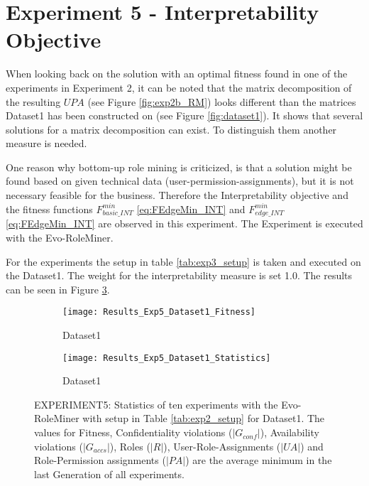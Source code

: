 \section{Experiment 5 - Interpretability Objective}
\label{sec:exp5}
When looking back on the solution with an optimal fitness found in one of the experiments in Experiment 2, it can be noted that the matrix decomposition of the resulting $UPA$ (see Figure \ref{fig:exp2b_RM}) looks different than the matrices Dataset1 has been constructed on (see Figure \ref{fig:dataset1}). It shows that several solutions for a matrix decomposition can exist. To distinguish them another measure is needed. 

One reason why bottom-up role mining is criticized, is that a solution might be found based on given technical data (user-permission-assignments), but it is not necessary feasible for the business. Therefore the Interpretability objective and the fitness functions
$F_{basic\_INT}^{min}$ \eqref{eq:FEdgeMin_INT} and $F_{edge\_INT}^{min}$ \eqref{eq:FEdgeMin_INT} are observed in this experiment. The Experiment is executed with the Evo-RoleMiner.

For the experiments the setup in table \ref{tab:exp3_setup} is taken and executed on the Dataset1. The weight for the interpretability measure is set 1.0. The results can be seen in Figure \ref{fig:Results_Exp5}.

\begin{figure}[H]
	\centering
	\begin{subfigure}{0.45\textwidth}
		\texttt{[image: Results\_Exp5\_Dataset1\_Fitness]}
		\caption{Dataset1}
		\label{fig:Results_Exp5_Dataset1_Fitness}
	\end{subfigure}%
	\begin{subfigure}{0.55\textwidth}
		\centering
		\texttt{[image: Results\_Exp5\_Dataset1\_Statistics]}
		\caption{Dataset1}
		\label{fig:Results_Exp5_Dataset1_Statistics}
	\end{subfigure}
	\caption{EXPERIMENT5: Statistics of ten experiments with the Evo-RoleMiner with setup in Table \ref{tab:exp2_setup} for Dataset1. The values for Fitness, Confidentiality violations ($|G_{conf}|$), Availability violations ($|G_{accs}|$), Roles ($|R|$), User-Role-Assignments ($|UA|$) and Role-Permission assignments ($|PA|$) are the average minimum in the last Generation of all experiments.}
	\label{fig:Results_Exp5}
\end{figure}

